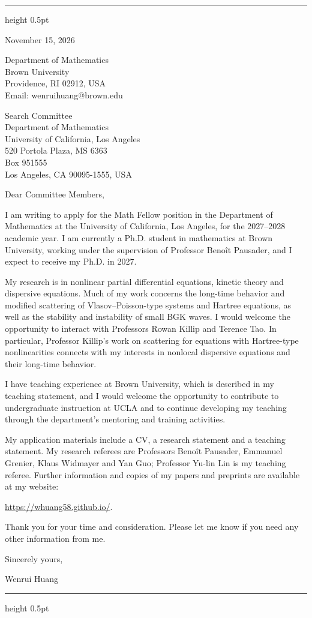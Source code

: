 \documentclass[10pt]{article}
\begin{document}
\vspace{0.08in}
\hrule height 0.5pt

\vspace{0.47in}
\hfill
\begin{minipage}{2.27in}
November 15, 2026

\vspace{0.16in}
Department of Mathematics\\
Brown University\\
Providence, RI 02912, USA\\
Email: wenrui\textunderscore huang@brown.edu
\end{minipage}

\vspace{0.30in}
Search Committee\\
Department of Mathematics\\
University of California, Los Angeles\\
520 Portola Plaza, MS 6363\\
Box 951555\\
Los Angeles, CA 90095-1555, USA

\vspace{0.16in}
Dear Committee Members,

I am writing to apply for the Math Fellow position in the Department of Mathematics at the University of California, Los Angeles, for the 2027--2028 academic year. I am currently a Ph.D. student in mathematics at Brown University, working under the supervision of Professor Beno\^{i}t Pausader, and I expect to receive my Ph.D. in 2027.

My research is in nonlinear partial differential equations, kinetic theory and dispersive equations. Much of my work concerns the long-time behavior and modified scattering of Vlasov--Poisson-type systems and Hartree equations, as well as the stability and instability of small BGK waves. I would welcome the opportunity to interact with Professors Rowan Killip and Terence Tao. In particular, Professor Killip's work on scattering for equations with Hartree-type nonlinearities connects with my interests in nonlocal dispersive equations and their long-time behavior.

I have teaching experience at Brown University, which is described in my teaching statement, and I would welcome the opportunity to contribute to undergraduate instruction at UCLA and to continue developing my teaching through the department's mentoring and training activities.

My application materials include a CV, a research statement and a teaching statement. My research referees are Professors Beno\^{i}t Pausader, Emmanuel Grenier, Klaus Widmayer and Yan Guo; Professor Yu-lin Lin is my teaching referee. Further information and copies of my papers and preprints are available at my website:

\url{https://whuang58.github.io/}.

\medskip
Thank you for your time and consideration. Please let me know if you need any other information from me.

\vspace{0.12in}
Sincerely yours,

\vspace{0.12in}
Wenrui Huang

\vfill
\hrule height 0.5pt
\end{document}
